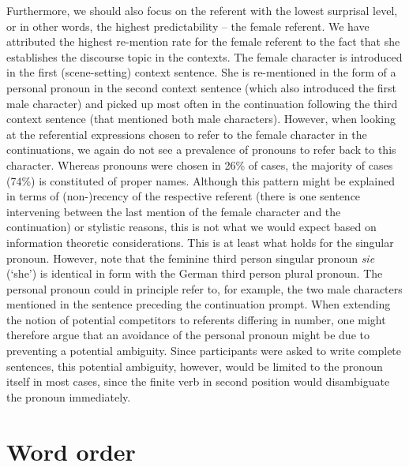 \documentclass[output=paper,colorlinks,citecolor=brown]{langscibook}
\begin{document}
Furthermore, we should also focus on the referent with the lowest surprisal level, or in other words, the highest predictability -- the female referent. We have attributed the highest re-mention rate for the female referent to the fact that she establishes the discourse topic in the contexts. The female character is introduced in the first (scene-setting) context sentence. She is re-mentioned in the form of a personal pronoun in the second context sentence (which also introduced the first male character) and picked up most often in the continuation following the third context sentence (that mentioned both male characters). However, when looking at the referential expressions chosen to refer to the female character in the continuations, we again do not see a prevalence of pronouns to refer back to this character. Whereas pronouns were chosen in 26\% of cases, the majority of cases (74\%) is constituted of proper names. Although this pattern might be explained in terms of (non-)recency of the respective referent (there is one sentence intervening between the last mention of the female character and the continuation) or stylistic reasons, this is not what we would expect based on information theoretic considerations. This is at least what holds for the singular pronoun. However, note that the feminine third person singular pronoun \textit{sie} (`she') is identical in form with the German third person plural pronoun. The personal pronoun could in principle refer to, for example, the two male characters mentioned in the sentence preceding the continuation prompt. When extending the notion of potential competitors to referents differing in number, one might therefore argue that an avoidance of the personal pronoun might be due to preventing a potential ambiguity. Since participants were asked to write complete sentences, this potential ambiguity, however, would be limited to the pronoun itself in most cases, since the finite verb in second position would disambiguate the pronoun immediately.




\section{Word order}\label{sec:word-order}
\end{document}
